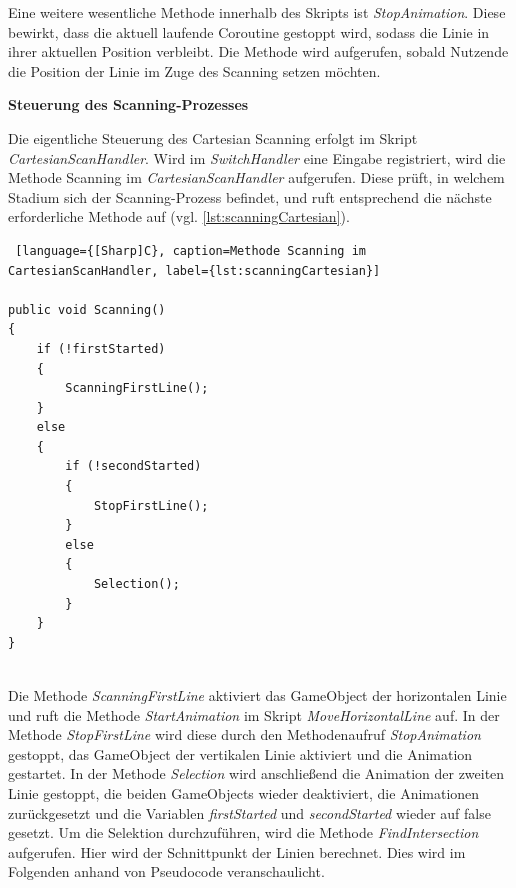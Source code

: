Eine weitere wesentliche Methode innerhalb des Skripts ist \textit{StopAnimation}. Diese bewirkt, dass die aktuell laufende Coroutine gestoppt wird, sodass die Linie in ihrer aktuellen Position verbleibt. Die Methode wird aufgerufen, sobald Nutzende die Position der Linie im Zuge des Scanning setzen möchten.

\textbf{Steuerung des Scanning-Prozesses}

Die eigentliche Steuerung des Cartesian Scanning erfolgt im Skript \textit{CartesianScanHandler}. Wird im \textit{SwitchHandler} eine Eingabe registriert, wird die Methode Scanning im \textit{CartesianScanHandler} aufgerufen. Diese prüft, in welchem Stadium sich der Scanning-Prozess befindet, und ruft entsprechend die nächste erforderliche Methode auf (vgl. \autoref{lst:scanningCartesian}). 

\begin{lstlisting} [language={[Sharp]C}, caption=Methode Scanning im CartesianScanHandler, label={lst:scanningCartesian}]

public void Scanning()
{
    if (!firstStarted)
    {
        ScanningFirstLine();
    }
    else
    {
        if (!secondStarted)
        {
            StopFirstLine();
        }
        else
        {
            Selection();
        }
    }
}
    
\end{lstlisting}

Die Methode \textit{ScanningFirstLine} aktiviert das GameObject der horizontalen Linie und ruft die Methode \textit{StartAnimation} im Skript \textit{MoveHorizontalLine} auf. In der Methode \textit{StopFirstLine} wird diese durch den Methodenaufruf \textit{StopAnimation} gestoppt, das GameObject der vertikalen Linie aktiviert und die Animation gestartet. In der Methode \textit{Selection} wird anschließend die Animation der zweiten Linie gestoppt, die beiden GameObjects wieder deaktiviert, die Animationen zurückgesetzt und die Variablen \textit{firstStarted} und \textit{secondStarted} wieder auf false gesetzt. Um die Selektion durchzuführen, wird die Methode \textit{FindIntersection} aufgerufen. Hier wird der Schnittpunkt der Linien berechnet. Dies wird im Folgenden anhand von Pseudocode veranschaulicht. 

